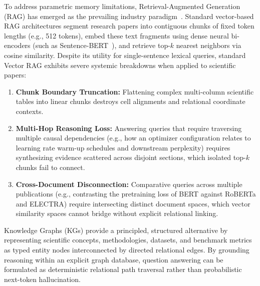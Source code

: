 \documentclass[12pt,a4paper,oneside]{report}
\begin{document}
To address parametric memory limitations, Retrieval-Augmented Generation (RAG) has emerged as the prevailing industry paradigm~\cite{lewis2020retrieval}. Standard vector-based RAG architectures segment research papers into contiguous chunks of fixed token lengths (e.g., 512 tokens), embed these text fragments using dense neural bi-encoders (such as Sentence-BERT~\cite{reimers2019sentence}), and retrieve top-$k$ nearest neighbors via cosine similarity. Despite its utility for single-sentence lexical queries, standard Vector RAG exhibits severe systemic breakdowns when applied to scientific papers:
\begin{enumerate}
    \item \textbf{Chunk Boundary Truncation:} Flattening complex multi-column scientific tables into linear chunks destroys cell alignments and relational coordinate contexts.
    \item \textbf{Multi-Hop Reasoning Loss:} Answering queries that require traversing multiple causal dependencies (e.g., how an optimizer configuration relates to learning rate warm-up schedules and downstream perplexity) requires synthesizing evidence scattered across disjoint sections, which isolated top-$k$ chunks fail to connect.
    \item \textbf{Cross-Document Disconnection:} Comparative queries across multiple publications (e.g., contrasting the pretraining loss of BERT against RoBERTa and ELECTRA) require intersecting distinct document spaces, which vector similarity spaces cannot bridge without explicit relational linking.
\end{enumerate}

Knowledge Graphs (KGs) provide a principled, structured alternative by representing scientific concepts, methodologies, datasets, and benchmark metrics as typed entity nodes interconnected by directed relational edges. By grounding reasoning within an explicit graph database, question answering can be formulated as deterministic relational path traversal rather than probabilistic next-token hallucination.
\end{document}
